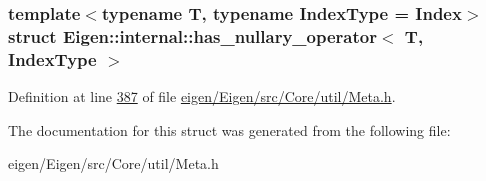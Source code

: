 \subsubsection*{template$<$typename T, typename Index\+Type = Index$>$\newline
struct Eigen\+::internal\+::has\+\_\+nullary\+\_\+operator$<$ T, Index\+Type $>$}



Definition at line \hyperlink{eigen_2_eigen_2src_2_core_2util_2_meta_8h_source_l00387}{387} of file \hyperlink{eigen_2_eigen_2src_2_core_2util_2_meta_8h_source}{eigen/\+Eigen/src/\+Core/util/\+Meta.\+h}.



The documentation for this struct was generated from the following file\+:\begin{DoxyCompactItemize}
\item 
eigen/\+Eigen/src/\+Core/util/\+Meta.\+h\end{DoxyCompactItemize}
